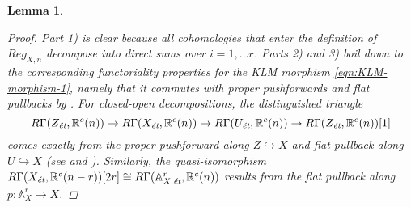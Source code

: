 \documentclass[10pt,a4paper,oneside,draft]{article}
\newcommand{\RR}{\mathbb{R}}
\renewcommand{\AA}{\mathbb{A}}
\newcommand{\et}{\text{\it \'{e}t}}
\theoremstyle{myplain}
\newtheorem{lemma}[theorem]{Lemma}
\theoremstyle{mydefinition}
\numberwithin{equation}{section}
\begin{document}
\begin{lemma}
  \begin{proof}
    Part 1) is clear because all cohomologies that enter the definition of
    $Reg_{X,n}$ decompose into direct sums over $i = 1,\ldots r$.  Parts 2) and
    3) boil down to the corresponding functoriality properties for the KLM
    morphism \eqref{eqn:KLM-morphism-1}, namely that it commutes with proper
    pushforwards and flat pullbacks by
    \cite[Lemma~3, Lemma~4]{Weisschuh-2017}. For closed-open decompositions, the
    distinguished triangle
    \[ R\Gamma (Z_\et, \RR^c (n)) \to R\Gamma (X_\et, \RR^c (n)) \to
      R\Gamma (U_\et, \RR^c (n)) \to R\Gamma (Z_\et, \RR^c (n)) [1] \]
    comes exactly from the proper pushforward along $Z \hookrightarrow X$ and
    flat pullback along $U \hookrightarrow X$ (see
    \cite[Corollary~7.2]{Geisser-2010} and \cite[\S 3]{Bloch-1986}). Similarly,
    the quasi-isomorphism
    $R\Gamma (X_\et, \RR^c (n-r)) [2r] \cong R\Gamma (\AA^r_{X,\et}, \RR^c (n))$
    results from the flat pullback along $p\colon \AA^r_X \to X$.
  \end{proof}
\end{lemma}
\end{document}
